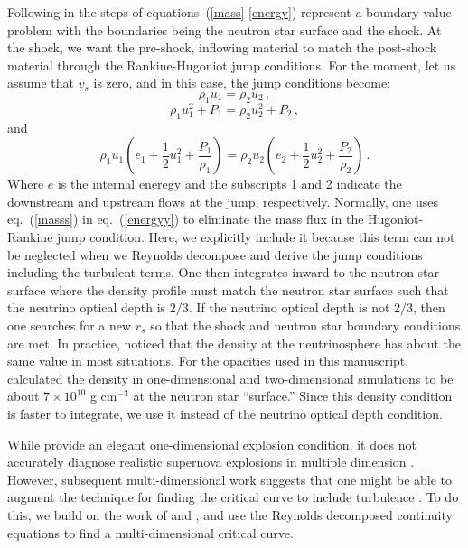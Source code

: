 \documentclass[twocolumn]{aastex6}
\begin{document}
Following in the steps of \citet{burrows93} equations~(\ref{mass}-\ref{energy}) represent a boundary value problem with the boundaries being the neutron star surface and the shock. At the shock, we want the pre-shock, inflowing material to match the post-shock material through the Rankine-Hugoniot jump conditions. For the moment, let us assume that $v_s$ is zero, and in this case, the jump conditions become:
\begin{equation}
\rho_1 u_1 = \rho_2 u_2 \, ,
\label{masss}
\end{equation}
\begin{equation}
\rho_1 u_1^2 + P_1 = \rho_2 u_2^2 + P_2 \, ,
\end{equation}
and
\begin{equation}
\rho_1 u_1 \left (e_1 + \frac{1}{2} u_1^2 + \frac{P_1}{\rho_1} \right ) = \rho_2 u_2 \left (e_2 + \frac{1}{2} u_2^2 + \frac{P_2}{\rho_2} \right ) \, .
\label{energyy}
\end{equation}
Where $e$ is the internal eneregy and the subscripts 1 and 2 indicate the downstream and upstream flows at the jump, respectively.
Normally, one uses eq.~(\ref{masss}) in eq.~(\ref{energyy}) to eliminate the
  mass flux in the Hugoniot-Rankine jump condition.  Here, we explicitly
  include it because this term can not be neglected when we Reynolds
  decompose and derive the
  jump conditions including the turbulent terms.
One then integrates inward to the neutron star surface where the
density profile must match the neutron star surface such that the
neutrino optical depth is $2/3$. If the neutrino optical
  depth is not $2/3$, then one searches for a new $r_s$ so that
the shock and neutron star boundary conditions are met.  In
  practice, \citet{yamasaki05} noticed that the density	at the neutrinosphere has about the same value in most
	situations.  For the opacities used in this manuscript,
  \citet{murphy08b} calculated the density in one-dimensional
  and two-dimensional simulations to be about $7 \times 10^{10}$ g cm$^{-3}$ at
the neutron star ``surface.''  Since this density condition is faster
to integrate, we use it instead of the neutrino optical depth condition.
  
While \citet{burrows93} provide an elegant one-dimensional explosion
condition, it does not accurately diagnose realistic supernova
explosions in multiple dimension \citep{murphy08b}. However, subsequent multi-dimensional work
suggests that one might be able to augment the technique for finding
the critical curve to include turbulence \citep{murphy13,murphy11,hanke12,couch13,radice16}. To do this, we build on the work of
\citet{murphy11} and \citet{murphy13}, and use the Reynolds decomposed continuity equations
to find a multi-dimensional critical curve. 
\end{document}
